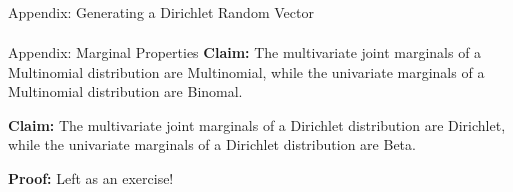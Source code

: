 \documentclass{beamer}
\begin{document}
\begin{frame}{Appendix: Generating a Dirichlet Random Vector}
{\begin{align*}
    \end{align*}}
\end{frame}

\begin{frame}{Appendix: Marginal Properties}
    \textbf{Claim:} The multivariate joint marginals of a Multinomial distribution are Multinomial, while the univariate marginals of a Multinomial distribution are Binomal. 
    
    \vspace{10pt}

    \textbf{Claim:} The multivariate joint marginals of a Dirichlet distribution are Dirichlet, while the univariate marginals of a Dirichlet distribution are Beta. 

    \vspace{10pt}

    \textbf{Proof:} Left as an exercise!
\end{frame}
\end{document}
